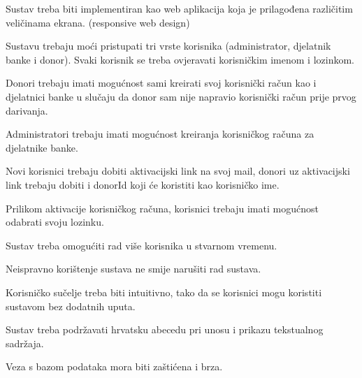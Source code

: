 \begin{packed_item}
	
	\item Sustav treba biti implementiran kao web aplikacija koja je prilagođena različitim veličinama ekrana. (responsive web design)
	\item Sustavu trebaju moći pristupati tri vrste korisnika (administrator, djelatnik banke i donor). Svaki korisnik se treba ovjeravati korisničkim imenom i lozinkom.
	\item Donori trebaju imati mogućnost sami kreirati svoj korisnički račun kao i djelatnici banke u slučaju da donor sam nije napravio korisnički račun prije prvog darivanja.
	\item Administratori trebaju imati mogućnost kreiranja korisničkog računa za djelatnike banke.
	\item Novi korisnici trebaju dobiti aktivacijski link na svoj mail, donori uz aktivacijski link trebaju dobiti i donorId koji će koristiti kao korisničko ime.
	\item Prilikom aktivacije korisničkog računa, korisnici trebaju imati mogućnost odabrati svoju lozinku.
	\item Sustav treba omogućiti rad više korisnika u stvarnom vremenu.
	\item Neispravno korištenje sustava ne smije narušiti rad sustava.
	\item Korisničko sučelje treba biti intuitivno, tako da se korisnici mogu koristiti sustavom bez dodatnih uputa.
	\item Sustav treba podržavati hrvatsku abecedu pri unosu i prikazu tekstualnog sadržaja.
	\item Veza s bazom podataka mora biti zaštićena i brza.

\end{packed_item}





